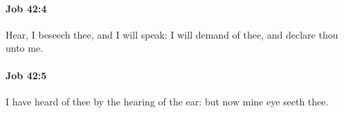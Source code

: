 		\paragraph{Job 42:4} %
			\label{JOB-42-4}

			Hear, I beseech thee, and I will speak: I will demand of thee, and declare thou unto me.


		\paragraph{Job 42:5} %
			\label{JOB-42-5}

			I have heard of thee by the hearing of the ear: but now mine eye seeth thee.


